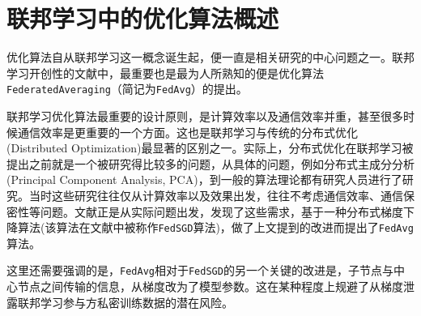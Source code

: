 \section{联邦学习中的优化算法概述}
\label{sec:chap2-overview}

优化算法自从联邦学习这一概念诞生起，便一直是相关研究的中心问题之一。联邦学习开创性的文献\parencite{mcmahan2017fed_avg}中，最重要也是最为人所熟知的便是优化算法\texttt{FederatedAveraging}（简记为\texttt{FedAvg}）的提出。

联邦学习优化算法最重要的设计原则，是计算效率以及通信效率并重，甚至很多时候通信效率是更重要的一个方面。这也是联邦学习与传统的分布式优化(Distributed Optimization)最显著的区别之一。实际上，分布式优化在联邦学习被提出之前就是一个被研究得比较多的问题，从具体的问题，例如分布式主成分分析(Principal Component Analysis, PCA)\cite{dist_pca_2014_nips}，到一般的算法理论\cite{boyd2011distributed}都有研究人员进行了研究。当时这些研究往往仅从计算效率以及效果出发，往往不考虑通信效率、通信保密性等问题。文献\parencite{mcmahan2017fed_avg}正是从实际问题出发，发现了这些需求，基于一种分布式梯度下降算法\cite{chen2016_revisit}(该算法在文献\parencite{mcmahan2017fed_avg}中被称作\texttt{FedSGD}算法)，做了上文提到的改进而提出了\texttt{FedAvg}算法。

这里还需要强调的是，\texttt{FedAvg}相对于\texttt{FedSGD}的另一个关键的改进是，子节点与中心节点之间传输的信息，从梯度改为了模型参数。这在某种程度上规避了从梯度泄露联邦学习参与方私密训练数据\cite{zhu2019deep_leakage}的潜在风险。

